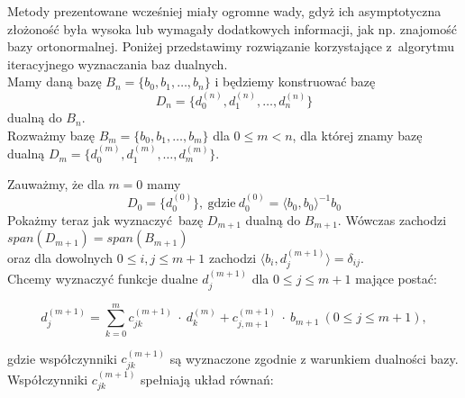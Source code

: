 \documentclass{article}
\begin{document}
Metody prezentowane wcześniej miały ogromne wady, gdyż ich asymptotyczna złożoność była wysoka lub wymagały dodatkowych informacji, jak np. znajomość bazy ortonormalnej. Poniżej przedstawimy rozwiązanie korzystające z~algorytmu iteracyjnego wyznaczania baz dualnych.\\

Mamy daną bazę $B_n = \lbrace b_0, b_1, \ldots, b_n \rbrace $ i będziemy konstruować bazę $$D_n = \lbrace d_0^{(n)}, d_1^{(n)}, \ldots, d_n^{(n)} \rbrace$$ dualną do $B_n$.\\

Rozważmy bazę $B_m = \lbrace b_0, b_1, \ldots, b_m \rbrace $ dla $0 \leq m < n$, dla której znamy bazę dualną $D_m = \lbrace d_0^{(m)}, d_1^{(m)}, \ldots, d_m^{(m)} \rbrace$.

Zauważmy, że dla $m = 0$ mamy $$D_0 = \lbrace d_0^{(0)} \rbrace, \  \text{gdzie} \  d_0^{(0)} = \langle b_0, b_0 \rangle^{-1} b_0$$ Pokażmy teraz jak wyznaczyć bazę $D_{m+1}$ dualną do $B_{m+1}$. Wówczas zachodzi $span \left( D_{m+1} \right)  =  span \left( B_{m+1} \right)$\\ oraz dla dowolnych $0 \leq i, j \leq m+1$ zachodzi $\langle b_i , d_j^{(m+1)}\rangle = \delta_{ij}$.\\

Chcemy wyznaczyć funkcje dualne $d_j^{(m+1)}$ dla $0 \leq j \leq m+1$ mające postać:
 
 $$
 d_j^{(m+1)} = \sum_{k=0}^{m} c_{jk}^{(m+1)} \ \cdot \ d_k^{(m)} + c_{j, m+1}^{(m+1)} \ \cdot \ b_{m+1} \ (0 \leq j \leq m+1),
 $$
 
 gdzie współczynniki $c_{jk}^{(m+1)}$ są wyznaczone zgodnie z warunkiem dualności bazy.\\ Współczynniki $c_{jk}^{(m+1)}$ spełniają układ równań:
 
\end{document}
